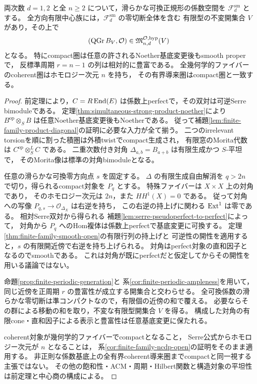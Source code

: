 \begin{theorem}\label{thm:simultaneous-smooth-ncdp-open}
両次数 $d=1,2$ と全 $n\ge2$ について，滑らかな可換正規形の係数空間を
$\mathcal F_d^{\mathrm{sm}}$ とする。
全方向有限中心族には，$\mathcal F_d^{\mathrm{sm}}$ の零切断全体を含む
有限型の不変開集合 $V$ があり，その上で
\[
 (\operatorname{QGr} B_V,\mathcal O)\in\mathfrak M^{\mathcal O,\mathrm{hyp}}_{n,d}(V)
\]
となる。
特にcompact圏は任意の許されるNoether基底変更後もsmooth properで，
反標準周期 $r=n-1$ の列は相対的に豊富である。
全幾何学的ファイバーのcoherent圏はホモロジー次元 $n$ を持ち，
その有界導来圏はcompact圏と一致する。
\end{theorem}
\begin{proof}
前定理により，$C=R\operatorname{End}(E)$ は係数上perfectで，その双対は可逆Serre bimoduleである。
定理\ref{thm:simultaneous-strong-product-noether}により
$B^{\mathrm{op}}\otimes_S B$ は任意Noether基底変更後もNoetherである。
従って補題\ref{lem:finite-family-product-diagonal}の証明に必要な入力が全て揃う。
二つのirrelevant torsionを順に割った積圏は外積twistでcompact生成され，
有限窓のMorita代数は $C^{\mathrm{op}}\otimes_S^LC$ である。
二重次数付き対角 $\Delta_{a,b}=B_{a+b}$ は有限生成かつ $S$-平坦で，
そのMorita像は標準の対角bimoduleとなる。

任意の滑らかな可換零方向点 $s$ を固定する。
$\Delta$ の有限生成自由解消を $q>2n$ で切り，得られるcompact対象を $P_q$ とする。
特殊ファイバーは $X\times X$ 上の対角であり，
そのホモロジー次元は $2n$，また $HH^1(X)=0$ である。
従って対角への写像 $P_{q,s}\to\mathcal O_{\Delta_X}$ は右逆を持ち，
この右逆の持上げに関わる $\operatorname{Ext}^1$ は零である。
相対Serre双対から得られる
補題\ref{lem:serre-pseudoperfect-to-perfect}によって，
対角から $P_q$ へのHom複体は係数上perfectで基底変更に可換する。
定理\ref{thm:finite-family-smooth-open}の有限行列の持上げと
可逆性の開性を適用すると，$s$ の有限開近傍で右逆を持ち上げられる。
対角はperfect対象の直和因子となるのでsmoothである。
これは対角が既にperfectだと仮定してからその開性を用いる議論ではない。

命題\ref{prop:finite-periodic-generation}と
系\ref{cor:finite-periodic-ampleness}を用いて，
同じ近傍を正周期 $r$ の豊富性が成立する開集合と交わらせる。
全可換係数の滑らかな零切断は準コンパクトなので，有限個の近傍の和で覆える。
必要ならその群による移動の和を取り，不変な有限型開集合 $V$ を得る。
構成した対角の有限cone・直和因子による表示と豊富性は任意基底変更に保たれる。

coherent対象が幾何学的ファイバーでcompactとなること，
Serre公式からホモロジー次元が $n$ となることは，
系\ref{cor:finite-family-ncdp-open}の証明をそのまま適用する。
非正則な係数基底上の全有界coherent導来圏までcompactと同一視する主張ではない。
その他の飽和性・ACM・周期・Hilbert関数と構造対象の平坦性は前定理と中心商の構成による。
\end{proof}

